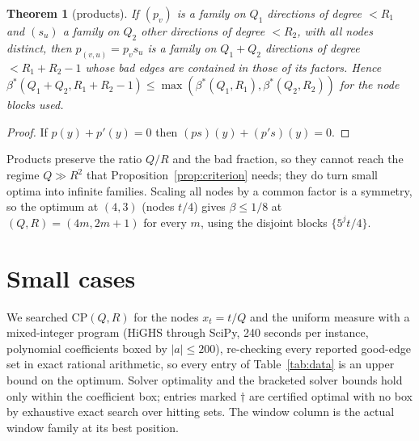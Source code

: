 \documentclass[11pt]{article}
\newtheorem{theorem}{Theorem}
\theoremstyle{definition}
\theoremstyle{remark}
\newcommand{\CP}{\mathrm{CP}}
\begin{document}
\begin{theorem}[products]\label{thm:product}
If $(p_v)$ is a family on $Q_1$ directions of degree $<R_1$ and $(s_u)$ a family on $Q_2$ other directions of degree $<R_2$, with all nodes distinct, then $p_{(v,u)}=p_vs_u$ is a family on $Q_1+Q_2$ directions of degree $<R_1+R_2-1$ whose bad edges are contained in those of its factors. Hence $\beta^*(Q_1+Q_2,R_1+R_2-1)\le\max(\beta^*(Q_1,R_1),\beta^*(Q_2,R_2))$ for the node blocks used.
\end{theorem}

\begin{proof}
If $p(y)+p'(y)=0$ then $(ps)(y)+(p's)(y)=0$.
\end{proof}

Products preserve the ratio $Q/R$ and the bad fraction, so they cannot reach the regime $Q\gg R^2$ that Proposition~\ref{prop:criterion} needs; they do turn small optima into infinite families. Scaling all nodes by a common factor is a symmetry, so the optimum at $(4,3)$ (nodes $t/4$) gives $\beta\le1/8$ at $(Q,R)=(4m,2m+1)$ for every $m$, using the disjoint blocks $\{5^jt/4\}$.

\section{Small cases}\label{sec:data}

We searched $\CP(Q,R)$ for the nodes $x_t=t/Q$ and the uniform measure with a mixed-integer program (HiGHS through SciPy, 240 seconds per instance, polynomial coefficients boxed by $|a|\le200$), re-checking every reported good-edge set in exact rational arithmetic, so every entry of Table~\ref{tab:data} is an upper bound on the optimum. Solver optimality and the bracketed solver bounds hold only within the coefficient box; entries marked $\dagger$ are certified optimal with no box by exhaustive exact search over hitting sets. The window column is the actual window family at its best position.
\end{document}
